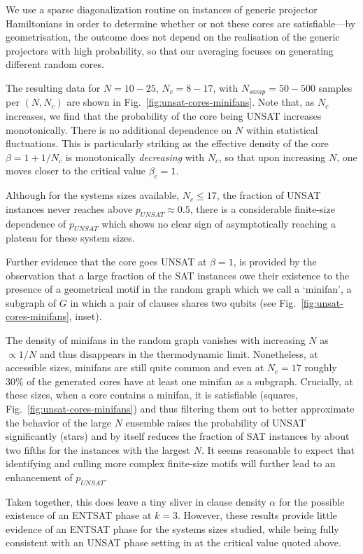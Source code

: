 \documentclass[aps,pra,twocolumn,superscriptaddress,amsmath]{revtex4-1}
\begin{document}
We use a sparse diagonalization routine on instances of generic projector Hamiltonians in order to determine whether or not these cores are satisfiable---by geometrisation, the outcome does not depend on the realisation of the generic projectors with high probability, so that our averaging focuses on generating different random cores. 

The resulting data for $N = 10-25$, $N_c = 8-17$, with $N_{samp} = 50-500$ samples per $(N, N_c)$ are shown in Fig.~\ref{fig:unsat-cores-minifans}. 
Note that, as $N_c$ increases, we find that the probability of the core being UNSAT increases monotonically. There is no additional dependence on $N$ within statistical fluctuations. 
This is particularly striking as the effective density of the core $\beta = 1 + 1/N_c$ is monotonically \emph{decreasing} with $N_c$, so that upon increasing $N$, one moves closer to the critical value $\beta_c=1$. 

Although for the systems sizes available, $N_c\leq17$, the fraction of UNSAT instances never reaches above $p_{UNSAT}\approx0.5$, there is a considerable finite-size dependence of $p_{UNSAT}$ which shows no clear sign of asymptotically reaching a plateau for these system sizes.

Further evidence that the core goes UNSAT at $\beta = 1$, is provided by the observation that a large fraction of the SAT instances owe their existence to the presence of a geometrical motif in the random graph which we call a `minifan', 
a subgraph of $G$ in which a pair of clauses shares two qubits (see Fig.~\ref{fig:unsat-cores-minifans}, inset). 

The density of minifans in the random graph vanishes with increasing $N$ as $\propto 1/N$  and thus disappears in the thermodynamic limit.
Nonetheless, at accessible sizes, minifans are still quite common and even at $N_c = 17$ roughly $30\%$ of the generated cores have at least one minifan as a subgraph. 
Crucially, at these sizes, when a core contains a minifan, it is satisfiable (squares, Fig.~\ref{fig:unsat-cores-minifans}) and thus filtering them out to better approximate the behavior of the large $N$ ensemble raises the probability of UNSAT significantly (stars) and by itself reduces the fraction of SAT instances by about two fifths for the instances with the largest $N$. 
It seems reasonable to expect that identifying and culling more complex finite-size motifs will further lead to an enhancement of $p_{UNSAT}$. 

Taken together, this does leave a tiny sliver in clause density $\alpha$ for the possible existence of an ENTSAT phase at $k=3$. However, these results provide little evidence of an ENTSAT phase for the systems sizes studied, while being fully consistent with an UNSAT phase setting in at the critical value quoted above. 
\end{document}

